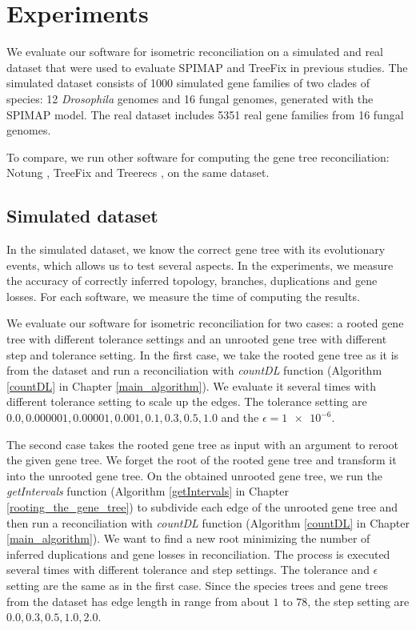 \chapter{Experiments}

We evaluate our software for isometric reconciliation on a simulated and real dataset that were used to evaluate SPIMAP \cite{spimap} and TreeFix \cite{treefix} in previous studies. The simulated dataset consists of 1000 simulated gene families of two clades of species: 12 \emph{Drosophila} genomes and 16 fungal genomes, generated with the SPIMAP model. The real dataset includes 5351 real gene families from 16 fungal genomes.

To compare, we run other software for computing the gene tree reconciliation: Notung \cite{notung}, TreeFix \cite{treefix} and Treerecs \cite{treerecs}, on the same dataset.

\section{Simulated dataset}

In the simulated dataset, we know the correct gene tree with its evolutionary events, which allows us to test several aspects. In the experiments, we measure the accuracy of correctly inferred topology, branches, duplications and gene losses. For each software, we measure the time of computing the results. 

We evaluate our software for isometric reconciliation for two cases: a rooted gene tree with different tolerance settings and an unrooted gene tree with different step and tolerance setting. In the first case, we take the rooted gene tree as it is from the dataset and run a reconciliation with \emph{countDL} function (Algorithm \ref{countDL} in Chapter \ref{main_algorithm}). We evaluate it several times with different tolerance setting to scale up the edges. The tolerance setting are $0.0, 0.000001, 0.00001, 0.001, 0.1, 0.3, 0.5, 1.0$ and the $\epsilon = \num{1e-6}$.

The second case takes the rooted gene tree as input with an argument to reroot the given gene tree. We forget the root of the rooted gene tree and transform it into the unrooted gene tree. On the obtained unrooted gene tree, we run the \emph{getIntervals} function (Algorithm \ref{getIntervals} in Chapter \ref{rooting_the_gene_tree}) to subdivide each edge of the unrooted gene tree and then run a reconciliation with \emph{countDL} function (Algorithm \ref{countDL} in Chapter \ref{main_algorithm}). We want to find a new root minimizing the number of inferred duplications and gene losses in reconciliation. The process is executed several times with different tolerance and step settings. The tolerance and $\epsilon$ setting are the same as in the first case. Since the species trees and gene trees from the dataset has edge length in range from about $1$ to $78$, the step setting are $0.0, 0.3, 0.5, 1.0, 2.0$.


